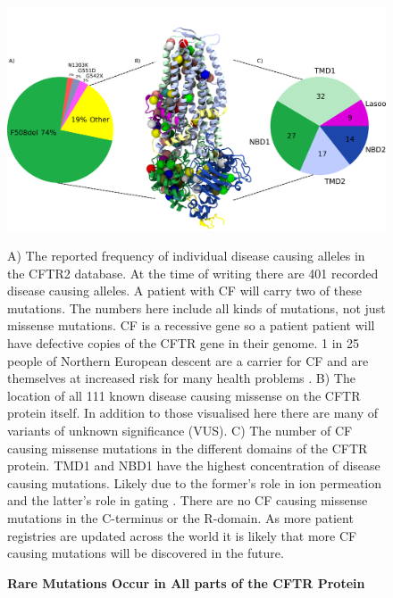 \begin{figure}
	\begin{center}
	\includegraphics[width=\textwidth]{figures/alleles_pie_chart.pdf}
	\end{center}
	\label{CFTR_structure_domains}
	\captionsetup{singlelinecheck = false, justification=raggedright}
	\caption[Rare Mutations Occur in All parts of the CFTR Protein] {\textbf{Rare Mutations Occur in All parts of the CFTR Protein}}{A) The reported frequency of individual disease causing alleles in the CFTR2 database. At the time of writing there are 401 recorded disease causing alleles. A patient with CF will carry two of these mutations. The numbers here include all kinds of mutations, not just missense mutations. CF is a recessive gene so a patient patient will have defective copies of the CFTR gene in their genome. 1 in 25 people of Northern European descent are a carrier for CF and are themselves at increased risk for many health problems \cite{ioannou2014, miller2020}. B) The location of all 111 known disease causing missense on the CFTR protein itself. In addition to those visualised here there are many of variants of unknown significance (VUS). C) The number of CF causing missense mutations in the different domains of the CFTR protein. TMD1 and NBD1 have the highest concentration of disease causing mutations. Likely due to the former's role in ion permeation and the latter's role in gating \cite{cftr2}}. There are no CF causing missense mutations in the C-terminus or the R-domain. As more patient registries are updated across the world it is likely that more CF causing mutations will be discovered in the future.  
\end{figure}


